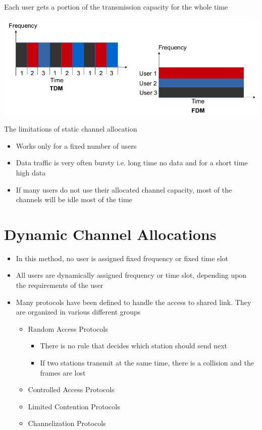 \documentclass{article}[18pt]
\begin{document}
\begin{defin}
Each user gets a portion of the transmission capacity for the whole time
\end{defin}
\begin{center}
	\includegraphics[scale=0.7]{"TDM vs FDM"}
\end{center}
The limitations of static channel allocation
\begin{itemize}
	\item Works only for a fixed number of users
	\item Data traffic is very often bursty i.e. long time no data and for a short time high data
	\item If many users do not use their allocated channel capacity, most of the channels will be idle most of the time
\end{itemize}
\section{Dynamic Channel Allocations}
\begin{itemize}
	\item In this method, no user is assigned fixed frequency or fixed time slot
	\item All users are dynamically assigned frequency or time slot, depending upon the requirements of the user
	\item Many protocols have been defined to handle the access to shared link. They are organized in various different groups
	\begin{itemize}
		\item Random Access Protocols
		\begin{itemize}
			\item There is no rule that decides which station should send next
			\item If two stations transmit at the same time, there is a collision and the frames are lost
		\end{itemize}
		\item Controlled Access Protocols
		\item Limited Contention Protocols
		\item Channelization Protocols
	\end{itemize}
\end{itemize}
\end{document}
